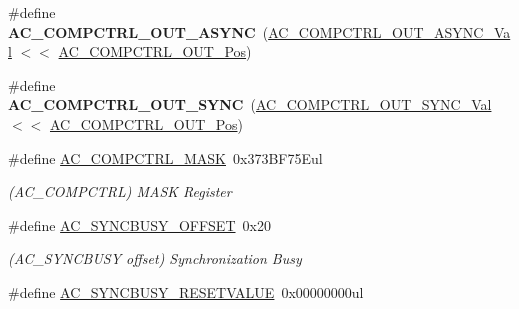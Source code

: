 \begin{DoxyCompactItemize}
\item 
\hypertarget{group___s_a_m_l21___a_c_ga808418dba5229a06f6db32f13032cbb0}{}\#define {\bfseries A\+C\+\_\+\+C\+O\+M\+P\+C\+T\+R\+L\+\_\+\+O\+U\+T\+\_\+\+A\+S\+Y\+N\+C}~(\hyperlink{group___s_a_m_l21___a_c_ga45c6b70bb8a6f53dc173f631c9ac7fca}{A\+C\+\_\+\+C\+O\+M\+P\+C\+T\+R\+L\+\_\+\+O\+U\+T\+\_\+\+A\+S\+Y\+N\+C\+\_\+\+Val}     $<$$<$ \hyperlink{group___s_a_m_l21___a_c_ga6dfe864873a0eadaba8922ecf4b25ed1}{A\+C\+\_\+\+C\+O\+M\+P\+C\+T\+R\+L\+\_\+\+O\+U\+T\+\_\+\+Pos})\label{group___s_a_m_l21___a_c_ga808418dba5229a06f6db32f13032cbb0}

\item 
\hypertarget{group___s_a_m_l21___a_c_ga73dd8696bf4218d77035cbe365edf0b2}{}\#define {\bfseries A\+C\+\_\+\+C\+O\+M\+P\+C\+T\+R\+L\+\_\+\+O\+U\+T\+\_\+\+S\+Y\+N\+C}~(\hyperlink{group___s_a_m_l21___a_c_ga85ea47206d4f4b7d3b3a59244ae48705}{A\+C\+\_\+\+C\+O\+M\+P\+C\+T\+R\+L\+\_\+\+O\+U\+T\+\_\+\+S\+Y\+N\+C\+\_\+\+Val}      $<$$<$ \hyperlink{group___s_a_m_l21___a_c_ga6dfe864873a0eadaba8922ecf4b25ed1}{A\+C\+\_\+\+C\+O\+M\+P\+C\+T\+R\+L\+\_\+\+O\+U\+T\+\_\+\+Pos})\label{group___s_a_m_l21___a_c_ga73dd8696bf4218d77035cbe365edf0b2}

\item 
\hypertarget{group___s_a_m_l21___a_c_ga485a4ac9ac9bea7b8d650fed87e02230}{}\#define \hyperlink{group___s_a_m_l21___a_c_ga485a4ac9ac9bea7b8d650fed87e02230}{A\+C\+\_\+\+C\+O\+M\+P\+C\+T\+R\+L\+\_\+\+M\+A\+S\+K}~0x373\+B\+F75\+Eul\label{group___s_a_m_l21___a_c_ga485a4ac9ac9bea7b8d650fed87e02230}

\begin{DoxyCompactList}\small\item\em (A\+C\+\_\+\+C\+O\+M\+P\+C\+T\+R\+L) M\+A\+S\+K Register \end{DoxyCompactList}\item 
\hypertarget{group___s_a_m_l21___a_c_ga1df5236f5d319dd7f69d24c1513d8040}{}\#define \hyperlink{group___s_a_m_l21___a_c_ga1df5236f5d319dd7f69d24c1513d8040}{A\+C\+\_\+\+S\+Y\+N\+C\+B\+U\+S\+Y\+\_\+\+O\+F\+F\+S\+E\+T}~0x20\label{group___s_a_m_l21___a_c_ga1df5236f5d319dd7f69d24c1513d8040}

\begin{DoxyCompactList}\small\item\em (A\+C\+\_\+\+S\+Y\+N\+C\+B\+U\+S\+Y offset) Synchronization Busy \end{DoxyCompactList}\item 
\hypertarget{group___s_a_m_l21___a_c_ga9042c602ca89a85a0bab56483064837b}{}\#define \hyperlink{group___s_a_m_l21___a_c_ga9042c602ca89a85a0bab56483064837b}{A\+C\+\_\+\+S\+Y\+N\+C\+B\+U\+S\+Y\+\_\+\+R\+E\+S\+E\+T\+V\+A\+L\+U\+E}~0x00000000ul\label{group___s_a_m_l21___a_c_ga9042c602ca89a85a0bab56483064837b}


\end{DoxyCompactItemize}
